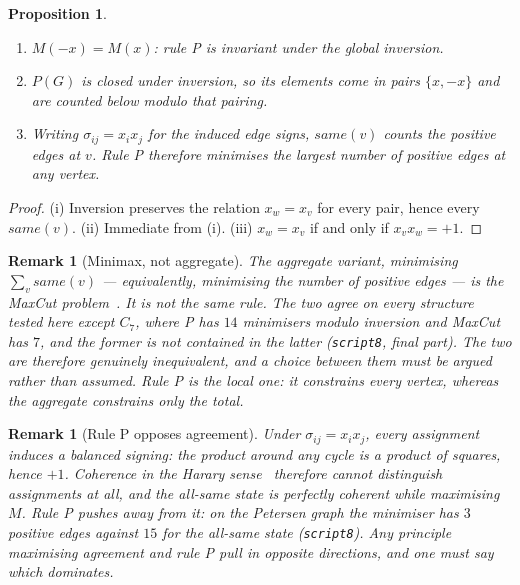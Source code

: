 \documentclass[11pt,a4paper]{article}
\def\mathrm#1{#1}%
\def\mathcal#1{#1}%
\newtheorem{proposition}[theorem]{Proposition}
\newtheorem{remark}[theorem]{Remark}
\newcommand{\same}{\mathrm{same}}
\begin{document}
\begin{proposition}
\label{prop:elementary}
\begin{enumerate}
\item[(i)] $M(-x)=M(x)$: rule P is invariant under the global inversion.
\item[(ii)] $\mathcal{P}(G)$ is closed under inversion, so its elements come in pairs $\{x,-x\}$ and are counted below modulo that pairing.
\item[(iii)] Writing $\sigma_{ij}=x_ix_j$ for the induced edge signs, $\same(v)$ counts the positive edges at $v$. Rule P therefore minimises the largest number of positive edges at any vertex.
\end{enumerate}
\end{proposition}

\begin{proof}
(i) Inversion preserves the relation $x_w=x_v$ for every pair, hence every $\same(v)$. (ii) Immediate from (i). (iii) $x_w=x_v$ if and only if $x_vx_w=+1$.
\end{proof}

\begin{remark}[Minimax, not aggregate]
\label{rem:minimax}
The aggregate variant, minimising $\sum_v\same(v)$ --- equivalently, minimising the number of positive edges --- is the MaxCut problem~\citep{Karp1972}. It is not the same rule. The two agree on every structure tested here except $C_7$, where P has $14$ minimisers modulo inversion and MaxCut has $7$, and the former is not contained in the latter (\texttt{script8}, final part). The two are therefore genuinely inequivalent, and a choice between them must be argued rather than assumed. Rule P is the local one: it constrains every vertex, whereas the aggregate constrains only the total.
\end{remark}

\begin{remark}[Rule P opposes agreement]
\label{rem:opposes}
Under $\sigma_{ij}=x_ix_j$, every assignment induces a balanced signing: the product around any cycle is a product of squares, hence $+1$. Coherence in the Harary sense~\citep{Harary1953} therefore cannot distinguish assignments at all, and the all-same state is perfectly coherent while maximising $M$. Rule P pushes away from it: on the Petersen graph the minimiser has $3$ positive edges against $15$ for the all-same state (\texttt{script8}). Any principle maximising agreement and rule P pull in opposite directions, and one must say which dominates.
\end{remark}
\end{document}
